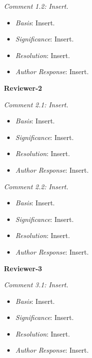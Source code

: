\documentclass[
]{book}
\providecommand{\tightlist}{%
  \setlength{\itemsep}{0pt}\setlength{\parskip}{0pt}}
\begin{document}
\emph{Comment 1.2: Insert.}

\begin{itemize}
\tightlist
\item
  \emph{Basis}: Insert.\\
\item
  \emph{Significance}: Insert.\\
\item
  \emph{Resolution}: Insert.\\
\item
  \emph{Author Response}: Insert.
\end{itemize}

\textbf{Reviewer-2}

\emph{Comment 2.1: Insert.}

\begin{itemize}
\tightlist
\item
  \emph{Basis}: Insert.\\
\item
  \emph{Significance}: Insert.\\
\item
  \emph{Resolution}: Insert.\\
\item
  \emph{Author Response}: Insert.
\end{itemize}

\emph{Comment 2.2: Insert.}

\begin{itemize}
\tightlist
\item
  \emph{Basis}: Insert.\\
\item
  \emph{Significance}: Insert.\\
\item
  \emph{Resolution}: Insert.\\
\item
  \emph{Author Response}: Insert.
\end{itemize}

\textbf{Reviewer-3}

\emph{Comment 3.1: Insert.}

\begin{itemize}
\tightlist
\item
  \emph{Basis}: Insert.\\
\item
  \emph{Significance}: Insert.\\
\item
  \emph{Resolution}: Insert.\\
\item
  \emph{Author Response}: Insert.
\end{itemize}
\end{document}
